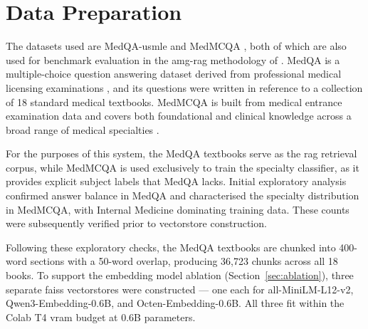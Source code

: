 \section{Data Preparation}
\label{sec:data}

The datasets used are MedQA-\gls{usmle} \cite{jin2021} and MedMCQA \cite{pal2022}, both of which are also used for benchmark evaluation in the \gls{amg-rag} methodology of \citet{rezaei2025}. MedQA is a multiple-choice question answering dataset derived from professional medical licensing examinations \cite{jin2021}, and its questions were written in reference to a collection of 18 standard medical textbooks. MedMCQA is built from medical entrance examination data and covers both foundational and clinical knowledge across a broad range of medical specialties \cite{pal2022}.

For the purposes of this system, the MedQA textbooks serve as the \gls{rag} retrieval corpus, while MedMCQA is used exclusively to train the specialty classifier, as it provides explicit subject labels that MedQA lacks. Initial exploratory analysis confirmed answer balance in MedQA and characterised the specialty distribution in MedMCQA, with Internal Medicine dominating training data. These counts were subsequently verified prior to vectorstore construction.

Following these exploratory checks, the MedQA textbooks are chunked into 400-word sections with a 50-word overlap, producing 36,723 chunks across all 18 books. To support the embedding model ablation (Section~\ref{sec:ablation}), three separate \gls{faiss} vectorstores were constructed --- one each for all-MiniLM-L12-v2, Qwen3-Embedding-0.6B, and Octen-Embedding-0.6B. All three fit within the Colab T4 \gls{vram} budget at 0.6B parameters.

